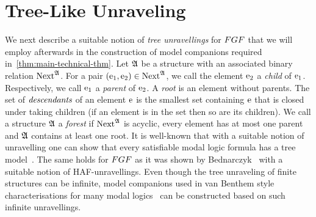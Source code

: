 
\section{Tree-Like Unraveling}\label{sec:unraveling}

We next describe a suitable notion of \emph{tree unravellings} for $\FGF$ that we will employ afterwards in the construction of model companions required in~\cref{thm:main-technical-thm}.
Let ${\mathfrak{A}}$ be a structure with an associated binary relation $\mathrm{Next}^{{\mathfrak{A}}}$.
For a pair $(\mathrm{e}_1, \mathrm{e}_2) \in \mathrm{Next}^{{\mathfrak{A}}}$, we call the element $\mathrm{e}_2$ a \emph{child} of $\mathrm{e}_1$. Respectively, we call $\mathrm{e}_1$ a \emph{parent} of $\mathrm{e}_2$.
A \emph{root} is an element without parents.
The set of $\emph{descendants}$ of an element $\mathrm{e}$ is the smallest set containing $\mathrm{e}$ that is closed under taking children (\ie if an element is in the set then so are its children).
We call a structure ${\mathfrak{A}}$ a \emph{forest} if $\mathrm{Next}^{{\mathfrak{A}}}$ is acyclic, every element has at most one parent and ${\mathfrak{A}}$ contains at least one root.
It is well-known that with a suitable notion of unravelling one can show that every satisfiable modal logic formula has a tree model~.
The same holds for $\FGF$ as it was shown by Bednarczyk~\cite[Sec 3.3]{Bednarczyk21} with a suitable notion of HAF-unravellings.
Even though the tree unraveling of finite structures can be infinite, model companions used in van Benthem style characterisations for many modal logics~\cite{Otto04} can be constructed based on such infinite unravellings.



